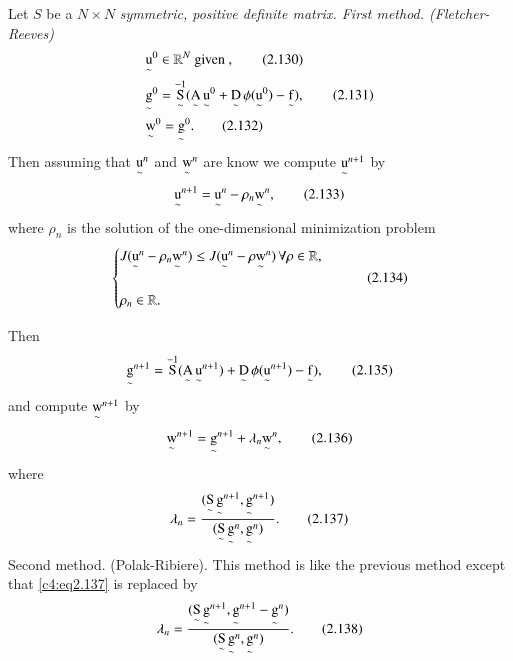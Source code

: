 Let $S$ be a $N \times N$ \textit{symmetric, positive definite
  matrix. First method. (Fletcher-Reeves)} 
\begin{align}
& {\operatorname*{u}\limits_\sim}^0 \in \mathbb{R}^N \text{ given },
  \tag{2.130}\label{c4:eq2.130}\\ 
& {\operatorname*{g}\limits_\sim}^0 = \operatorname*{S}\limits_\sim^{-1}(\operatorname*{A} \limits_\sim
  {\operatorname*{u}\limits_\sim}^0 + \operatorname*{D}\limits_\sim \phi ({\operatorname*{u}\limits_\sim}^0)
  -\operatorname*{f}\limits_\sim), \tag{2.131}\label{c4:eq2.131}\\ 
& {\operatorname*{w}\limits_\sim}^0 = {\operatorname*{g}\limits_\sim}^0. \tag{2.132}\label{c4:eq2.132}
\end{align}
Then assuming that ${\operatorname*{u}\limits_\sim}^n$ and ${\operatorname*{w}\limits_\sim}^n$ are know
we compute ${\operatorname*{u} \limits_\sim}^{n+1}$ by 
 \begin{equation}
{\operatorname*{u}\limits_\sim}^{n+1} = {\operatorname*{u} \limits_\sim}^n -\rho _n {\operatorname*{w}
  \limits_\sim}^{n}, \tag{2.133}\label{c4:eq2.133} 
  \end{equation} 
where $\rho_n$ is the solution of the one-dimensional minimization problem
\begin{equation}
\begin{cases}
J({\operatorname*{u} \limits_\sim}^n -\rho_n {\operatorname*{w} \limits_\sim}^n) \leq J({\operatorname*{u}
  \limits_\sim}^n -\rho  {\operatorname*{w}\limits_\sim}^n)\, \forall \rho \in
\mathbb{R}, \\ 
&\\
\rho_n \in \mathbb{R}.
\end{cases}\tag{2.134}\label{c4:eq2.134}
\end{equation}

Then\pageoriginale 
\begin{equation}
{\operatorname*{g}\limits_\sim}^{n+1} =\operatorname*{S}^{-1}(\operatorname*{A}\limits_\sim
{\operatorname*{u}\limits_\sim}^{n+1}) + \operatorname*{D}\limits_\sim \phi
({\operatorname*{u}\limits_\sim}^{n+1})-\operatorname*{f}\limits_\sim),\tag{2.135}\label{c4:eq2.135}  
\end{equation}
and compute ${\operatorname*{w}\limits_\sim}^{n+1}$ by
\begin{equation}
{\operatorname*{w}\limits_\sim}^{n+1}= {\operatorname*{g}\limits_\sim}^{n+1}+ \lambda_n
{\operatorname*{w}\limits_\sim}^n, \tag{2.136}\label{c4:eq2.136} 
\end{equation}
where 
\begin{equation}
\lambda_n = \frac{(\operatorname*{S} \limits_\sim {\operatorname*{g}\limits_\sim}^{n+1}, {\operatorname*{g}
  \limits_\sim}^{n+1})}{(\operatorname*{S} \limits_\sim  {\operatorname*{g}\limits_\sim}^{n}, {\operatorname*{g}
  \limits_\sim}^n )}. \tag{2.137}\label{c4:eq2.137} 
\end{equation}
Second method. (Polak-Ribiere). This method is like the previous
method except that \eqref{c4:eq2.137} is replaced by  
\begin{equation}
\lambda_n= \frac{(\operatorname*{S} \limits_\sim {\operatorname*{g}\limits_\sim}^{n+1}, {\operatorname*{g}
  \limits_\sim}^{n+1}-{\operatorname*{g} \limits_\sim}^n )}{(\operatorname*{S} \limits_\sim
  {\operatorname*{g}\limits_\sim}^{n}, {\operatorname*{g}\limits_\sim}^{n})}. \tag{2.138}\label{c4:eq2.138} 
\end{equation}

